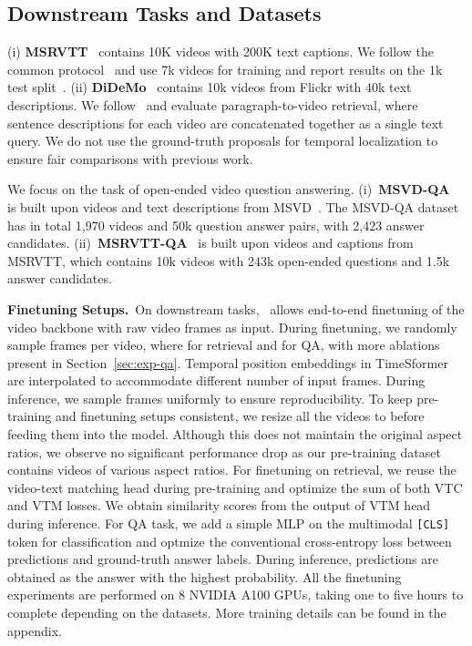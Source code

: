 \documentclass[10pt,twocolumn,letterpaper]{article}
\begin{document}
\subsection{Downstream Tasks and Datasets}\label{sec:exp-setup}
 (i) \textbf{MSRVTT}~\cite{xu2016msr} contains 10K videos with 200K text captions. We follow the common protocol~\cite{yu2018joint,miech2019howto100m,li2020hero,zhu2020actbert,lei2021less} and use 7k videos for training and report results on the 1k test split~\cite{yu2018joint}. (ii) \textbf{DiDeMo}~\cite{anne2017localizing} contains 10k videos from Flickr with 40k text descriptions. We follow~\cite{liuuse,lei2021less,luo2020univl} and evaluate paragraph-to-video retrieval, where sentence descriptions for each video are concatenated together as a single text query.
We do not use the ground-truth proposals for temporal localization to ensure fair comparisons with previous work.

 We focus on the task of open-ended video question answering.
(i)~\textbf{MSVD-QA}~\cite{xu2017video} is built upon videos and text descriptions from MSVD~\cite{chen2011collecting}. The MSVD-QA dataset has in total 1,970 videos and 50k question answer pairs, with 2,423 answer candidates.
(ii)~\textbf{MSRVTT-QA}~\cite{xu2017video} is built upon videos and captions from MSRVTT, which contains 10k videos with 243k open-ended questions and 1.5k answer candidates. 

\noindent\textbf{Finetuning Setups.}~On downstream tasks, \name~allows end-to-end finetuning of the video backbone with raw video frames as input. During finetuning, we randomly sample  frames per video, where  for retrieval and  for QA, with more ablations present in Section~\ref{sec:exp-qa}.
Temporal position embeddings in TimeSformer are interpolated to accommodate different number of input frames.
During inference, we sample frames uniformly to ensure reproducibility.
To keep pre-training and finetuning setups consistent,
we resize all the videos to  before feeding them into the model. Although this does not maintain the original aspect ratios, we observe no significant performance drop as our pre-training dataset contains videos of various aspect ratios.
For finetuning on retrieval, we reuse the video-text matching head during pre-training and optimize the sum of both VTC and VTM losses.
We obtain similarity scores from the output of VTM head during inference.
For QA task, we add a simple MLP on the multimodal \texttt{[CLS]} token for classification and optmize the conventional cross-entropy loss between predictions and ground-truth answer labels.
During inference, predictions are obtained as the answer with the highest probability.
All the finetuning experiments are performed on 8 NVIDIA A100 GPUs, taking one to five hours to complete depending on the datasets.
More training details can be found in the appendix.
\end{document}
